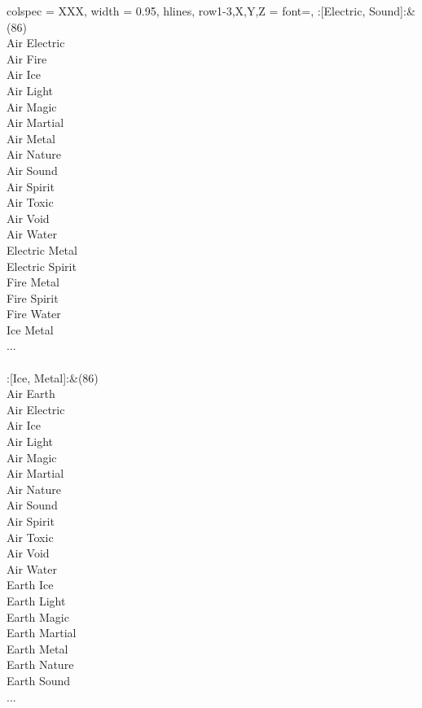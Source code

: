 \begin{longtblr}[
	caption = {2v2 Defending Weak},
	label = {2v2-Defending-Weak},
]{
	colspec = {XXX}, width = 0.95\linewidth,
	hlines,
	row{1-3,X,Y,Z} = {font=\bfseries},
}
	:[Electric, Sound]:&{(86)\\
	Air Electric \\
	Air Fire \\
	Air Ice \\
	Air Light \\
	Air Magic \\
	Air Martial \\
	Air Metal \\
	Air Nature \\
	Air Sound \\
	Air Spirit \\
	Air Toxic \\
	Air Void \\
	Air Water \\
	Electric Metal \\
	Electric Spirit \\
	Fire Metal \\
	Fire Spirit \\
	Fire Water \\
	Ice Metal \\
	...\\
	}\\

	:[Ice, Metal]:&{(86)\\
	Air Earth \\
	Air Electric \\
	Air Ice \\
	Air Light \\
	Air Magic \\
	Air Martial \\
	Air Nature \\
	Air Sound \\
	Air Spirit \\
	Air Toxic \\
	Air Void \\
	Air Water \\
	Earth Ice \\
	Earth Light \\
	Earth Magic \\
	Earth Martial \\
	Earth Metal \\
	Earth Nature \\
	Earth Sound \\
	...\\
	}\\


\end{longtblr}
